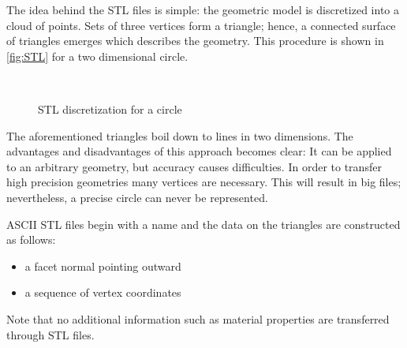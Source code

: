 The idea behind the STL files is simple: the geometric model is discretized into a cloud of points. Sets of three vertices form a triangle; hence, a connected surface of triangles emerges which describes the geometry. This procedure is shown in \autoref{fig:STL} for a two dimensional circle.  
\begin{figure}
\centering
   \\
   \caption{STL discretization for a circle}
   \label{fig:STL}
\end{figure}
The aforementioned triangles boil down to lines in two dimensions. The advantages and disadvantages of this approach becomes clear: It can be applied to an arbitrary geometry, but accuracy causes difficulties. In order to transfer high precision geometries many vertices are necessary. This will result in big files; nevertheless, a precise circle can never be represented. 

ASCII STL files begin with a name and the data on the triangles are constructed as follows: 
\begin{itemize}
\item a facet normal pointing outward
\item a sequence of vertex coordinates
\end{itemize}
Note that no additional information such as material properties are transferred through STL files. 
